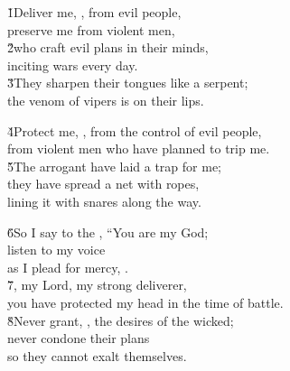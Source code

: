 
\begin{poetry}
\poeml \v{1}Deliver me, , from evil people, \\
\poemll    preserve me from violent men, \\
\poeml \v{2}who craft evil plans in their minds, \\
\poemll    inciting wars every day. \\
\poeml \v{3}They sharpen their tongues like a serpent; \\
\poemll    the venom of vipers is on their lips.
\end{poetry}

\begin{poetry}
\poeml \v{4}Protect me, , from the control of evil people, \\
\poemll    from violent men who have planned to trip me. \\
\poeml \v{5}The arrogant have laid a trap for me; \\
\poemll    they have spread a net with ropes, \\
\poemlll       lining it with snares along the way.
\end{poetry}

\begin{poetry}
\poeml \v{6}So I say to the , ``You are my God; \\
\poemll    listen to my voice \\
\poemlll       as I plead for mercy, . \\
\poeml \v{7}, my Lord, my strong deliverer, \\
\poemll    you have protected my head in the time of battle. \\
\poeml \v{8}Never grant, , the desires of the wicked; \\
\poemll    never condone their plans \\
\poemlll       so they cannot exalt themselves.
\end{poetry}

